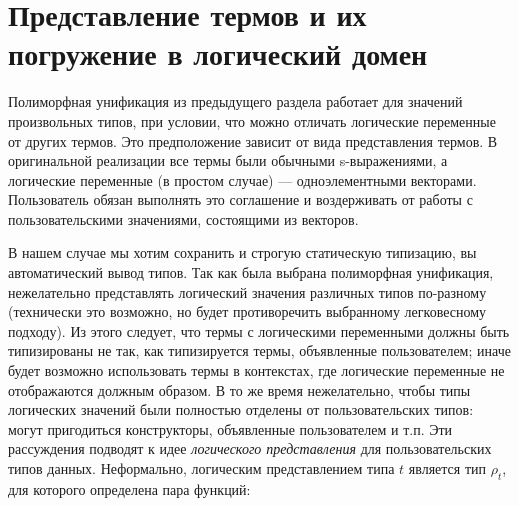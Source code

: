 
\section{Представление термов и их погружение в логический домен}
\label{sec:injection}

Полиморфная унификация из предыдущего раздела работает для значений произвольных типов, при условии, что можно отличать логические переменные от других термов.
Это предположение зависит  от вида представления термов.
В оригинальной реализации все термы были обычными s-выражениями, а логические переменные (в простом случае) --- одноэлементными векторами.
Пользователь обязан выполнять это соглашение и воздерживать от работы с пользовательскими значениями, состоящими из векторов.


В нашем случае мы хотим сохранить и строгую статическую типизацию, вы автоматический вывод типов.
Так как была выбрана полиморфная унификация, нежелательно представлять логический значения различных типов по-разному (технически это возможно, но будет противоречить выбранному легковесному подходу). Из этого следует, что термы с логическими переменными должны быть типизированы не так, как типизируется термы, объявленные пользователем; иначе будет возможно использовать термы в контекстах, где логические переменные не отображаются должным образом.
В то же время нежелательно, чтобы типы логических значений были полностью отделены от пользовательских типов: могут пригодиться конструкторы, объявленные пользователем и т.п.
Эти рассуждения подводят к идее \emph{логического представления} для пользовательских типов данных.
Неформально, логическим представлением типа $t$ является тип $\rho_t$, для которого определена пара функций:


